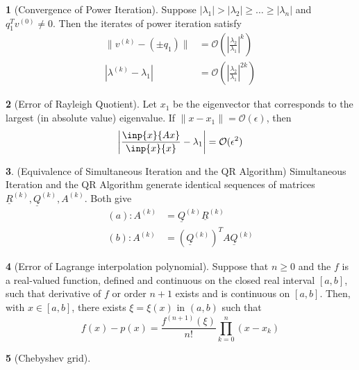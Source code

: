 \documentclass[12pt]{article}
\theoremstyle{definition}
\newtheorem{theorem}{\color{ForestGreen}{\textbf{Theorem}}}
\newcommand{\e}{\epsilon}
\newcommand{\norm}[1]{\lVert#1\rVert}
\begin{document}
\begin{theorem}[Convergence of Power Iteration]
Suppose $|\lambda_1|  > |\lambda_2| \geq \ldots \geq |\lambda_n|$ and $q_1^T v^{(0)} \neq 0$. Then the iterates of power iteration satisfy
\begin{align}
\norm{v^{(k)} - (\pm q_1)} &= \mathcal{O}\left( \left\vert \frac{\lambda_2}{\lambda_1} \right\vert^k \right) \tag{error of eigenvector} \\
|\lambda^{(k)} - \lambda_1 | &= \mathcal{O}\left( \left\vert \frac{\lambda_2}{\lambda_1} \right\vert^{2k} \right) \tag{error of eigenvalue}
\end{align}
\end{theorem}

\begin{theorem}[Error of Rayleigh Quotient]
Let $x_1$ be the eigenvector that corresponds to the largest (in absolute value) eigenvalue. If $\norm{x - x_1} = \mathcal{O}(\e)$, then
\begin{equation}
\left\vert \frac{\inp{x}{Ax}}{\inp{x}{x}}  - \lambda_1 \right\vert = \mathcal{O}(\e^2)
\end{equation}
\end{theorem}

\begin{theorem}(Equivalence of Simultaneous Iteration and the QR Algorithm)
Simultaneous Iteration and the QR Algorithm generate identical sequences of matrices $\underline R^{(k)}, \underline Q^{(k)}, A^{(k)}$. Both give
\begin{align}
(a): A^{(k)} &= \underline Q^{(k)} \underline R^{(k)} \tag{$QR$ factorization of the $k$th power of $A$}\\
(b): A^{(k)} &= (\underline Q^{(k)})^T A \underline Q^{(k)} \tag{projection}
\end{align}
\end{theorem}

\begin{theorem}[Error of Lagrange interpolation polynomial]
Suppose that $n\geq 0$ and the $f$ is a real-valued function, defined and continuous on the closed real interval $[a,b]$, such that derivative of $f$ or order $n+1$ exists and is continuous on $[a,b]$. Then, with $x \in [a,b]$, there exists $\xi = \xi(x)$ in $(a,b)$ such that
\begin{equation}
f(x) - p(x) = \frac{f^{(n+1)}(\xi)}{n!} \prod_{k=0}^n (x-x_k)
\end{equation}
\end{theorem}

\begin{theorem}[Chebyshev grid]

\end{theorem}
\end{document}
